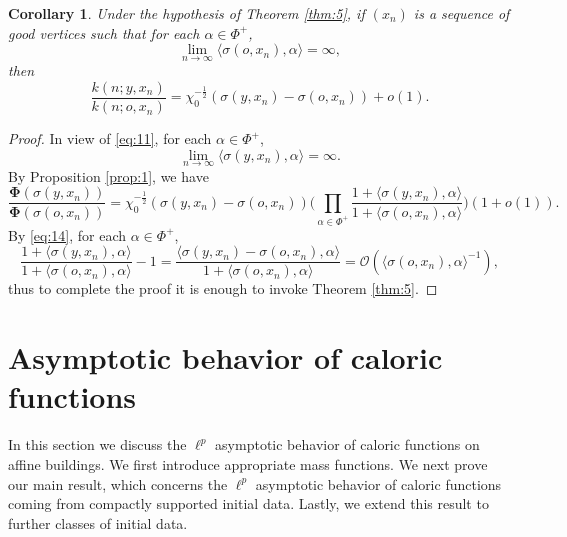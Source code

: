 \documentclass[11pt]{amsart}
\newcommand{\calO}{\mathcal{O}}
\newcommand{\sprod}[2]{\langle {#1}, {#2} \rangle}
\theoremstyle{plain}
\newcounter{thm}
\newtheorem{corollary}[theorem]{Corollary}
\theoremstyle{definition}
\numberwithin{equation}{section}
\begin{document}
\begin{corollary}
	\label{cor:1}
	Under the hypothesis of Theorem \ref{thm:5}, if $(x_n)$ is a sequence of good vertices such that
	for each $\alpha \in \Phi^+$,
	\[
		\lim_{n \to \infty} \sprod{\sigma(o, x_n)}{\alpha} = \infty,
	\]
	then
	\[
		\frac{k(n; y, x_n)}{k(n; o, x_n)}=
		\chi_0^{-\frac{1}{2}}(\sigma(y,x_n)-\sigma(o,x_n)) + o(1).
	\]
\end{corollary}
\begin{proof}
	In view of \eqref{eq:11}, for each $\alpha \in \Phi^+$,
	\[
		\lim_{n \to \infty} \sprod{\sigma(y, x_n)}{\alpha} = \infty.
	\]
	By Proposition \ref{prop:1}, we have
	\[
		\frac{\mathbf{\Phi}(\sigma(y, x_n))}{\mathbf{\Phi}(\sigma(o, x_n))}
		=
		\chi_{0}^{-\frac{1}{2}}(\sigma(y,x_n)-\sigma(o,x_n))
		\bigg(\prod_{\alpha \in \Phi^+}
		\frac{1 + \sprod{\sigma(y, x_n)}{\alpha}}{1+ \sprod{\sigma(o, x_n)}{\alpha}}\bigg)(1+o(1)).
	\]
	By \eqref{eq:14}, for each $\alpha \in \Phi^+$,
	\[
		\frac{1 + \sprod{\sigma(y, x_n)}{\alpha}}{1+ \sprod{\sigma(o, x_n)}{\alpha}} - 1
		=
		\frac{\sprod{\sigma(y, x_n) - \sigma(o, x_n)}{\alpha}}{1+ \sprod{\sigma(o, x_n)}{\alpha}}
		=
		\calO(\sprod{\sigma(o, x_n)}{\alpha}^{-1}),
	\]
	thus to complete the proof it is enough to invoke Theorem \ref{thm:5}.
\end{proof}

\section{Asymptotic behavior of caloric functions}
\label{sec:4}
In this section we discuss the $\ell^p$ asymptotic behavior of caloric functions on affine buildings. We first introduce 
appropriate mass functions. We next prove our main result, which concerns the $\ell^p$ asymptotic behavior of caloric 
functions coming from compactly supported initial data. Lastly, we extend this result to further classes of initial data.
\end{document}
